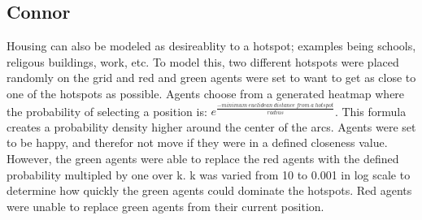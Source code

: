 \documentclass[11pt]{article}
\begin{document}
	\newpage
	
	\subsection{Connor}
	Housing can also be modeled as desireablity to a hotspot; examples being schools, religous buildings, work, etc. To model this, two different hotspots were placed randomly on the grid and red and green agents were set to want to get as close to one of the hotspots as possible. Agents choose from a generated heatmap where the probability of selecting a position is: $e^{\frac{- minimum\ euclidean\ distance\ from\ a\ hotspot}{radius}}$. This formula creates a probability density higher around the center of the arcs. Agents were set to be happy, and therefor not move if they were in a defined closeness value. However, the green agents were able to replace the red agents with the defined probability multipled by one over k. k was varied from 10 to 0.001 in log scale to determine how quickly the green agents could dominate the hotspots. Red agents were unable to replace green agents from their current position.
	
\end{document}
